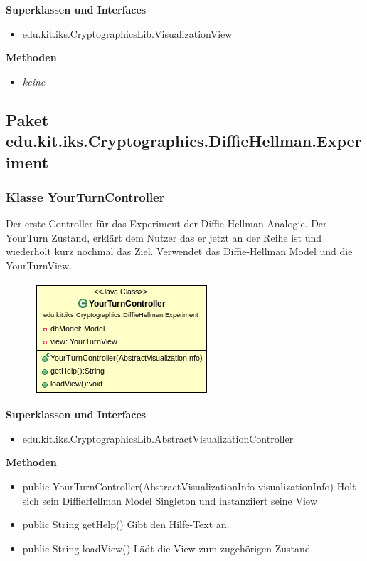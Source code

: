\documentclass{article}
\begin{document}
      \textbf{Superklassen und Interfaces}
      \begin{itemize}
        \item edu.kit.iks.CryptographicsLib.VisualizationView
      \end{itemize}

      \textbf{Methoden}
      \begin{itemize}
        \item \textit{keine}
      \end{itemize}

\subsection{Paket edu.kit.iks.Cryptographics.DiffieHellman.Experiment}

\subsubsection{Klasse YourTurnController}
      Der erste Controller für das Experiment der Diffie-Hellman Analogie.
      Der YourTurn Zustand, erklärt dem Nutzer das er jetzt an der Reihe ist
      und wiederholt kurz nochmal das Ziel.
      Verwendet das Diffie-Hellman Model und die YourTurnView.

      \begin{figure}[H]
        \centering
        \includegraphics{resources/edu-kit-iks-Cryptographics-DiffieHellman-Experiment-YourTurnController}
      \end{figure}

      \textbf{Superklassen und Interfaces}
      \begin{itemize}
        \item edu.kit.iks.CryptographicsLib.AbstractVisualizationController
      \end{itemize}

      \textbf{Methoden}
      \begin{itemize}
          \item public YourTurnController(AbstractVisualizationInfo visualizationInfo) \newline
              Holt sich sein DiffieHellman Model Singleton und instanziiert seine View
        \item public String getHelp() \newline
        Gibt den Hilfe-Text an.
        \item public String loadView() \newline
        Lädt die View zum zugehörigen Zustand.
      \end{itemize}
\end{document}
